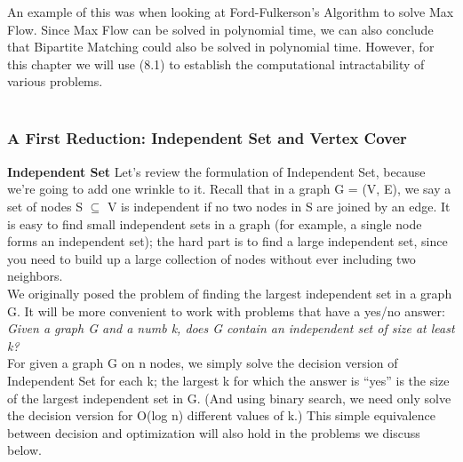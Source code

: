 \documentclass{article}
\begin{document}
An example of this was when looking at Ford-Fulkerson's Algorithm to solve Max Flow. Since Max Flow can be solved in polynomial time, we can also conclude that Bipartite Matching could also be solved in polynomial time. However, for this chapter we will use (8.1) to establish the computational intractability of various problems.\\

 \\

\subsubsection{A First Reduction: Independent Set and Vertex Cover}
\textbf{Independent Set} Let’s review the formulation of Independent Set, because we’re going to add one wrinkle to it. Recall that in a graph G = (V, E), we say a set of nodes S $\subseteq$ V is independent if no two nodes in S are joined by an edge. It is easy to find small independent sets in a graph (for example, a single node forms an independent set); the hard part is to find a large independent set, since you need to build up a large collection of nodes without ever including two neighbors.\\

We originally posed the problem of finding the largest independent set in a graph G. It will be more convenient to work with problems that have a yes/no answer:\\

\emph{Given a graph G and a numb k, does G contain an independent set of size at least k?}\\

For given a graph G on n nodes, we simply solve the decision version of Independent Set for each k; the largest k for which the answer is “yes” is the size of the largest independent set in G. (And using binary search, we need only solve the decision version for O(log n) different values of k.) This simple equivalence between decision and optimization will also hold in the problems we discuss below.\\
\end{document}

